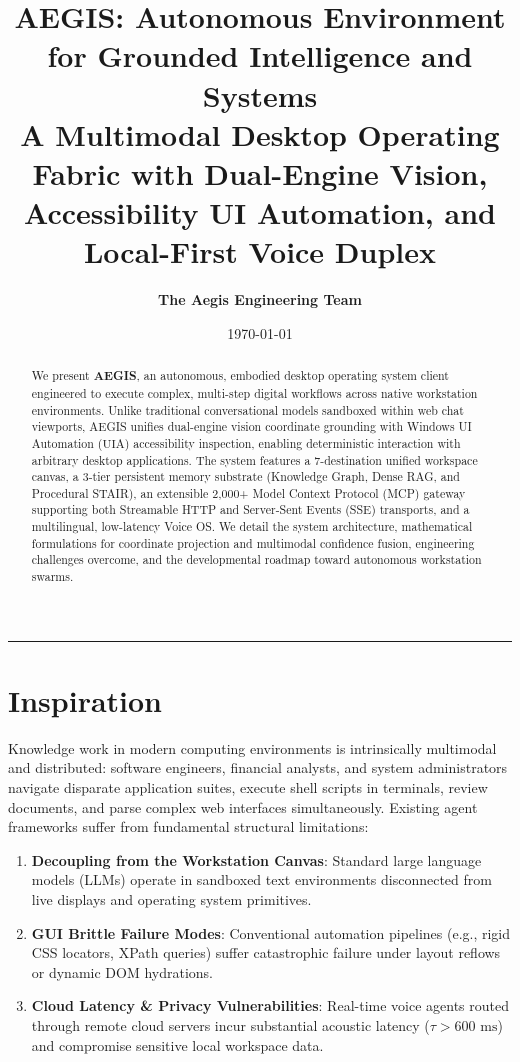 \documentclass[11pt,a4paper]{article}
\title{\textbf{AEGIS: Autonomous Environment for Grounded Intelligence and Systems}\\
\large A Multimodal Desktop Operating Fabric with Dual-Engine Vision, Accessibility UI Automation, and Local-First Voice Duplex}
\author{\textbf{The Aegis Engineering Team}}
\date{\today}
\begin{document}
\maketitle

\begin{abstract}
We present \textbf{AEGIS}, an autonomous, embodied desktop operating system client engineered to execute complex, multi-step digital workflows across native workstation environments. Unlike traditional conversational models sandboxed within web chat viewports, AEGIS unifies dual-engine vision coordinate grounding with Windows UI Automation ($\text{UIA}$) accessibility inspection, enabling deterministic interaction with arbitrary desktop applications. The system features a 7-destination unified workspace canvas, a 3-tier persistent memory substrate (Knowledge Graph, Dense RAG, and Procedural STAIR), an extensible 2,000+ Model Context Protocol (MCP) gateway supporting both Streamable HTTP and Server-Sent Events (SSE) transports, and a multilingual, low-latency Voice OS. We detail the system architecture, mathematical formulations for coordinate projection and multimodal confidence fusion, engineering challenges overcome, and the developmental roadmap toward autonomous workstation swarms.
\end{abstract}

\vspace{1em}
\hrule
\vspace{1.5em}

\section{Inspiration}

Knowledge work in modern computing environments is intrinsically multimodal and distributed: software engineers, financial analysts, and system administrators navigate disparate application suites, execute shell scripts in terminals, review documents, and parse complex web interfaces simultaneously. Existing agent frameworks suffer from fundamental structural limitations:

\begin{enumerate}
    \item \textbf{Decoupling from the Workstation Canvas}: Standard large language models (LLMs) operate in sandboxed text environments disconnected from live displays and operating system primitives.
    \item \textbf{GUI Brittle Failure Modes}: Conventional automation pipelines (e.g., rigid CSS locators, XPath queries) suffer catastrophic failure under layout reflows or dynamic DOM hydrations.
    \item \textbf{Cloud Latency \& Privacy Vulnerabilities}: Real-time voice agents routed through remote cloud servers incur substantial acoustic latency ($\tau > 600\text{ ms}$) and compromise sensitive local workspace data.
\end{enumerate}
\end{document}
